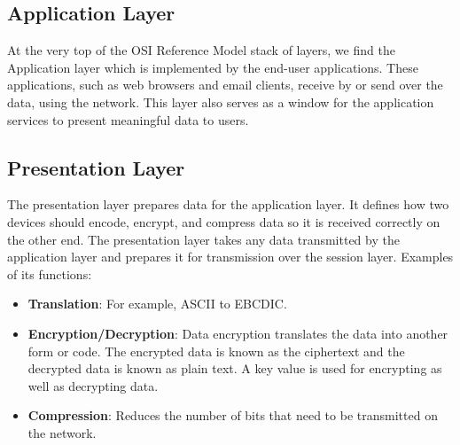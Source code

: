 \documentclass{article}
\begin{document}
    \subsection{Application Layer}
    At the very top of the OSI Reference Model stack of layers, we find the Application layer which is implemented by the end-user applications. These applications, such as web browsers and email clients, receive by or send over the data, using the network. This layer also serves as a window for the application services to present meaningful data to users.
    
    \subsection{Presentation Layer}
    The presentation layer prepares data for the application layer. It defines how two devices should encode, encrypt, and compress data so it is received correctly on the other end. The presentation layer takes any data transmitted by the application layer and prepares it for transmission over the session layer.
    Examples of its functions:
    \begin{itemize}
        \item \textbf{Translation}: For example, ASCII to EBCDIC.
        \item \textbf{Encryption/Decryption}: Data encryption translates the data into another form or code. The encrypted data is known as the ciphertext and the decrypted data is known as plain text. A key value is used for encrypting as well as decrypting data.
        \item \textbf{Compression}: Reduces the number of bits that need to be transmitted on the network.
    \end{itemize}
    
\end{document}
